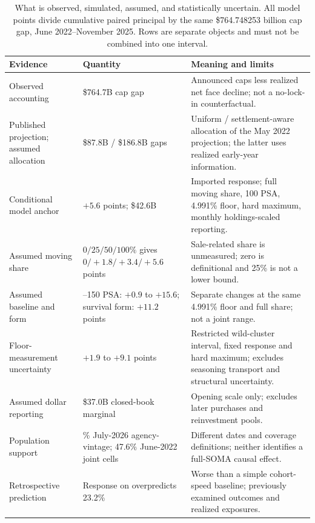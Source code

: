 \begin{table}[H]
\centering\small\singlespacing
\caption{What is observed, simulated, assumed, and statistically uncertain. All model points divide cumulative paired principal by the same \$764.748253 billion cap gap, June 2022--November 2025. Rows are separate objects and must not be combined into one interval.}
\label{tab:evidenceoverview}
\begin{tabular}{@{}>{\raggedright\arraybackslash}p{3.2cm}>{\raggedright\arraybackslash}p{4.1cm}>{\raggedright\arraybackslash}p{7.0cm}@{}}
\toprule
Evidence & Quantity & Meaning and limits\\\midrule
Observed accounting & \$764.7B cap gap & Announced caps less realized net face decline; not a no-lock-in counterfactual.\\
Published projection; assumed allocation & \$87.8B / \$186.8B gaps & Uniform / settlement-aware allocation of the May 2022 projection; the latter uses realized early-year information.\\
Conditional model anchor & $+5.6$ points; \$42.6B & Imported response; full moving share, 100 PSA, 4.991\% floor, hard maximum, monthly holdings-scaled reporting.\\
Assumed moving share & $0/25/50/100\%$ gives $0/+1.8/+3.4/+5.6$ points & Sale-related share is unmeasured; zero is definitional and 25\% is not a lower bound.\\
Assumed baseline and form & 75--150 PSA: $+0.9$ to $+15.6$; survival form: $+11.2$ points & Separate changes at the same 4.991\% floor and full share; not a joint range.\\
Floor-measurement uncertainty & $+1.9$ to $+9.1$ points & Restricted wild-cluster interval, fixed response and hard maximum; excludes seasoning transport and structural uncertainty.\\
Assumed dollar reporting & \$37.0B closed-book marginal & Opening scale only; excludes later purchases and reinvestment pools.\\
Population support & 51.0\% July-2026 agency-vintage; 47.6\% June-2022 joint cells & Different dates and coverage definitions; neither identifies a full-SOMA causal effect.\\
Retrospective prediction & Response on overpredicts 23.2\% & Worse than a simple cohort-speed baseline; previously examined outcomes and realized exposures.\\
\bottomrule
\end{tabular}
\end{table}
